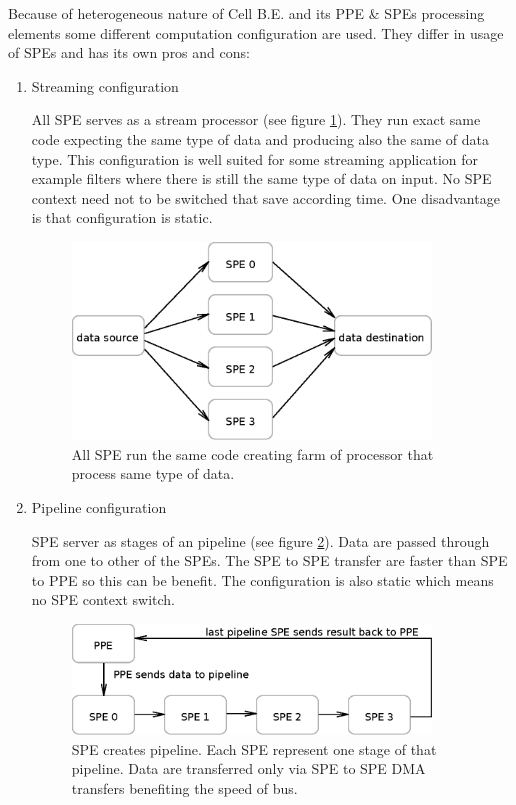 \par
Because of heterogeneous nature of Cell B.E. and its PPE \& SPEs processing elements some different computation configuration are used.
 They differ in usage of SPEs and has its own pros and cons:
\begin{enumerate}
\item Streaming configuration
\par
All SPE serves as a stream processor (see figure \ref{fg:streamingModel}).
They run exact same code expecting the same type of data and producing also the same of data type.
This configuration is well suited for some streaming application for example filters where there is still the same type of data on input.
No SPE context need not to be switched that save according time.
One disadvantage is that configuration is static.

\begin{figure}
    \centering
    \includegraphics[width=0.9\textwidth]{data/streamingModel}
    \caption[Streaming SPE configuration]{All SPE run the same code creating farm of processor that process same type of data.}
    \label{fg:streamingModel}
\end{figure}

\item Pipeline configuration
\par
SPE server as stages of an pipeline (see figure \ref{fg:pipelineModel}).
Data are passed through from one to other of the SPEs.
The SPE to SPE transfer are faster than SPE to PPE so this can be benefit.
The configuration is also static which means no SPE context switch.

\begin{figure}
    \centering
    \includegraphics[width=0.9\textwidth]{data/pipelineModel}
    \caption[Pipeline SPE configuration]{SPE creates pipeline. Each SPE represent one stage of that pipeline. Data are transferred only via SPE to SPE DMA transfers benefiting the speed of bus.}
    \label{fg:pipelineModel}
\end{figure}


\end{enumerate}
